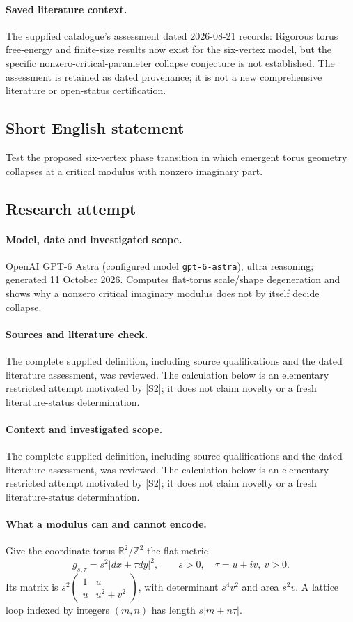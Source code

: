 \documentclass[11pt]{article}
\begin{document}
\paragraph{Saved literature context.} The supplied catalogue's assessment dated 2026-08-21 records: Rigorous torus free-energy and finite-size results now exist for the six-vertex model, but the specific nonzero-critical-parameter collapse conjecture is not established. The assessment is retained as dated provenance; it is not a new comprehensive literature or open-status certification.
\subsection{Short English statement}
Test the proposed six-vertex phase transition in which emergent torus geometry collapses at a critical modulus with nonzero imaginary part.
\subsection{Research attempt}
\paragraph{Model, date and investigated scope.}
OpenAI GPT-6 Astra (configured model \texttt{gpt-6-astra}), ultra reasoning; generated 11 October 2026. Computes flat-torus scale/shape degeneration and shows why a nonzero critical imaginary modulus does not by itself decide collapse.

\paragraph{Sources and literature check.}
The complete supplied definition, including source qualifications and the dated literature assessment, was reviewed. The calculation below is an elementary restricted attempt motivated by [S2]; it does not claim novelty or a fresh literature-status determination.

\paragraph{Context and investigated scope.} The complete supplied definition, including source qualifications and the dated literature assessment, was reviewed. The calculation below is an elementary restricted attempt motivated by [S2]; it does not claim novelty or a fresh literature-status determination.

\paragraph{What a modulus can and cannot encode.} Give the coordinate torus $\mathbb R^2/\mathbb Z^2$ the flat metric
\[
 g_{s,\tau}=s^2|dx+\tau dy|^2,\qquad s>0,\quad\tau=u+iv,\ v>0.
\]
Its matrix is $s^2\left(\begin{smallmatrix}1&u\\u&u^2+v^2\end{smallmatrix}\right)$, with determinant $s^4v^2$ and area $s^2v$. A lattice loop indexed by integers $(m,n)$ has length $s|m+n\tau|$.
\end{document}
